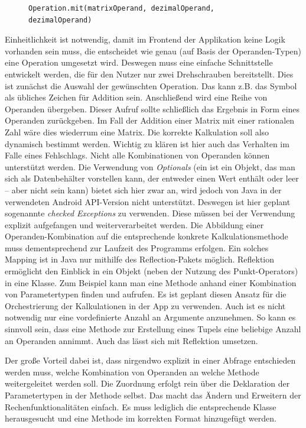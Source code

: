 \begin{figure}[bht]
	\begin{lstlisting}[caption=Konzept für Nutzung generischer Schnittstelle, label=list:konzept-fuer-nutzung-generischer-schnittstelle]
	Operation.mit(matrixOperand, dezimalOperand, dezimalOperand)
	\end{lstlisting}    
\end{figure}

Einheitlichkeit ist notwendig, damit im Frontend der Applikation keine Logik vorhanden sein muss, die entscheidet wie genau (auf Basis der Operanden-Typen) eine Operation umgesetzt wird. Deswegen muss eine einfache Schnittstelle entwickelt werden, die für den Nutzer nur zwei Drehschrauben bereitstellt. Dies ist zunächst die Auswahl der gewünschten Operation. Das kann z.B. das Symbol \code{+} als übliches Zeichen für Addition sein. Anschließend wird eine Reihe von Operanden übergeben. Dieser Aufruf sollte schließlich das Ergebnis in Form eines Operanden zurückgeben. Im Fall der Addition einer Matrix mit einer rationalen Zahl wäre dies wiederrum eine Matrix. Die korrekte Kalkulation soll also dynamisch bestimmt werden. Wichtig zu klären ist hier auch das Verhalten im Falle eines Fehlschlags. Nicht alle Kombinationen von Operanden können unterstützt werden. Die Verwendung von \textit{Optionals} (ein  ist ein Objekt, das man sich als Datenbehälter vorstellen kann, der entweder einen Wert enthält oder leer – aber nicht  sein kann) bietet sich hier zwar an, wird jedoch von Java in der verwendeten Android API-Version nicht unterstützt. Deswegen ist hier geplant sogenannte \textit{checked Exceptions} zu verwenden. Diese müssen bei der Verwendung explizit aufgefangen und weiterverarbeitet werden. Die Abbildung einer Operanden-Kombination auf die entsprechende konkrete Kalkulationsmethode muss dementsprechend zur Laufzeit des Programms erfolgen. Ein solches Mapping ist in Java nur mithilfe des Reflection-Pakets möglich. Reflektion ermöglicht den Einblick in ein Objekt (neben der Nutzung des Punkt-Operators) in eine Klasse. Zum Beispiel kann man eine Methode anhand einer Kombination von Parametertypen finden und aufrufen. Es ist geplant diesen Ansatz für die Orchestrierung der Kalkulationen in der App zu verwenden. Auch ist es nicht notwendig nur eine vordefinierte Anzahl an Argumente anzunehmen. So kann es sinnvoll sein, dass eine Methode zur Erstellung eines Tupels eine beliebige Anzahl an Operanden annimmt. Auch das lässt sich mit Reflektion umsetzen.

Der große Vorteil dabei ist, dass nirgendwo explizit in einer Abfrage entschieden werden muss, welche Kombination von Operanden an welche Methode weitergeleitet werden soll. Die Zuordnung erfolgt rein über die Deklaration der Parametertypen in der Methode selbst. Das macht das Ändern und Erweitern der Rechenfunktionalitäten einfach. Es muss lediglich die entsprechende Klasse herausgesucht und eine Methode im korrekten Format hinzugefügt werden. 

